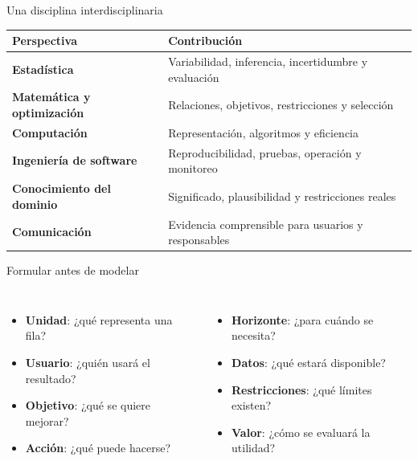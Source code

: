 \documentclass[aspectratio=169,11pt]{beamer}
\newcommand{\concepto}[1]{\textcolor{UAPTeal}{\textbf{#1}}}
\begin{document}
\begin{frame}{Una disciplina interdisciplinaria}
  \small
  \begin{tabularx}{\textwidth}{>{\bfseries}p{} X}
    \toprule
    Perspectiva & Contribución \\
    \midrule
    Estadística & Variabilidad, inferencia, incertidumbre y evaluación \\
    Matemática y optimización & Relaciones, objetivos, restricciones y selección \\
    Computación & Representación, algoritmos y eficiencia \\
    Ingeniería de software & Reproducibilidad, pruebas, operación y monitoreo \\
    Conocimiento del dominio & Significado, plausibilidad y restricciones reales \\
    Comunicación & Evidencia comprensible para usuarios y responsables \\
    \bottomrule
  \end{tabularx}
\end{frame}

\begin{frame}{Formular antes de modelar}
  \begin{columns}[T]
      \begin{itemize}
        \item \concepto{Unidad}: ¿qué representa una fila?
        \item \concepto{Usuario}: ¿quién usará el resultado?
        \item \concepto{Objetivo}: ¿qué se quiere mejorar?
        \item \concepto{Acción}: ¿qué puede hacerse?
      \end{itemize}
      \begin{itemize}
        \item \concepto{Horizonte}: ¿para cuándo se necesita?
        \item \concepto{Datos}: ¿qué estará disponible?
        \item \concepto{Restricciones}: ¿qué límites existen?
        \item \concepto{Valor}: ¿cómo se evaluará la utilidad?
      \end{itemize}
  \end{columns}
\end{frame}
\end{document}

